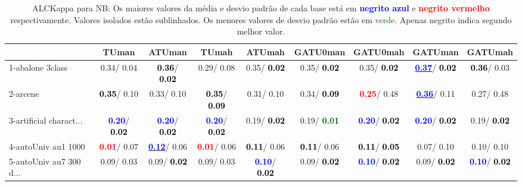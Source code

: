 \begin{table}[h]
\caption{ALCKappa para NB: Os maiores valores da média e desvio padrão de cada base está em \textcolor{blue}{\textbf{negrito azul}} e \textcolor{red}{\textbf{negrito vermelho}} respectivamente. Valores isolados estão sublinhados. Os menores valores de desvio padrão estão em \textcolor{darkgreen}{verde}. Apenas negrito indica segundo melhor valor.}
\begin{center}\begin{tabular}{lc|c|c|c|c|c|c|c}
 & TUman & \textbf{ATUman} & TUmah & \textbf{ATUmah} & GATU0man & GATU0mah & GATUman & GATUmah\\ \hline 1-abalone 3class &   0.34/  0.04 & \textcolor{black}{\textbf{  0.36}}/\textcolor{black}{\textbf{  0.02}} &   0.29/  0.08 &   0.35/\textcolor{black}{\textbf{  0.02}} &   0.35/\textcolor{black}{\textbf{  0.02}} &   0.35/\textcolor{black}{\textbf{  0.02}} & \underline{\textcolor{blue}{\textbf{  0.37}}}/\textcolor{black}{\textbf{  0.02}} & \textcolor{black}{\textbf{  0.36}}/  0.03 \\
2-arcene & \textcolor{black}{\textbf{  0.35}}/  0.10 &   0.33/  0.10 & \textcolor{black}{\textbf{  0.35}}/\textcolor{black}{\textbf{  0.09}} &   0.31/  0.10 &   0.34/\textcolor{black}{\textbf{  0.09}} & \textcolor{red}{\textbf{  0.25}}/  0.48 & \underline{\textcolor{blue}{\textbf{  0.36}}}/  0.11 &   0.27/  0.48 \\
3-artificial charact... & \textcolor{blue}{\textbf{  0.20}}/\textcolor{black}{\textbf{  0.02}} & \textcolor{blue}{\textbf{  0.20}}/\textcolor{black}{\textbf{  0.02}} & \textcolor{blue}{\textbf{  0.20}}/\textcolor{black}{\textbf{  0.02}} &   0.19/\textcolor{black}{\textbf{  0.02}} &   0.19/\textcolor{darkgreen}{\textbf{  0.01}} & \textcolor{blue}{\textbf{  0.20}}/\textcolor{black}{\textbf{  0.02}} & \textcolor{blue}{\textbf{  0.20}}/\textcolor{black}{\textbf{  0.02}} &   0.19/\textcolor{black}{\textbf{  0.02}} \\
4-autoUniv au1 1000 & \textcolor{red}{\textbf{  0.01}}/  0.07 & \underline{\textcolor{blue}{\textbf{  0.12}}}/  0.06 & \textcolor{red}{\textbf{  0.01}}/  0.06 & \textcolor{black}{\textbf{  0.11}}/  0.06 & \textcolor{black}{\textbf{  0.11}}/  0.06 & \textcolor{black}{\textbf{  0.11}}/\textcolor{black}{\textbf{  0.05}} &   0.07/  0.10 &   0.10/  0.10 \\
5-autoUniv au7 300 d... &   0.09/  0.03 &   0.09/\textcolor{black}{\textbf{  0.02}} &   0.09/  0.03 & \textcolor{blue}{\textbf{  0.10}}/\textcolor{black}{\textbf{  0.02}} &   0.09/\textcolor{black}{\textbf{  0.02}} & \textcolor{blue}{\textbf{  0.10}}/\textcolor{black}{\textbf{  0.02}} &   0.09/\textcolor{black}{\textbf{  0.02}} & \textcolor{blue}{\textbf{  0.10}}/\textcolor{black}{\textbf{  0.02}} \\

\end{tabular}
\end{center}
\end{table}
